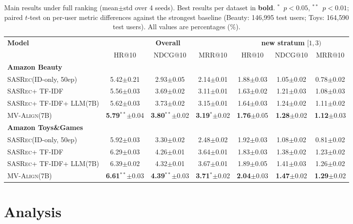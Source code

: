 \documentclass[sigconf,natbib=true,anonymous]{acmart}
\newcommand{\model}{\textsc{MV-Align}\xspace}
\newcommand{\base}{\textsc{SASRec}\xspace}
\newcommand{\tfidf}{\textsc{TF-IDF}\xspace}
\newcommand{\llm}{\textsc{LLM}\xspace}
\begin{document}
\begin{table}[t]
\caption{Main results under full ranking (mean$\pm$std over 4 seeds). Best results per dataset in \textbf{bold}. $^{*}$~$p{<}0.05$, $^{**}$~$p{<}0.01$; paired $t$-test on per-user metric differences against the strongest baseline (Beauty: 146{,}995 test users; Toys: 164{,}590 test users). All values are percentages (\%).}
\label{tab:main}
\centering
\small
\begin{tabular}{lcccccc}
\toprule
\multirow{2}{*}{\textbf{Model}} &
\multicolumn{3}{c}{\textbf{Overall}} &
\multicolumn{3}{c}{\textbf{new stratum} $[1,3)$} \\
\cmidrule(lr){2-4}\cmidrule(lr){5-7}
& HR@10 & NDCG@10 & MRR@10 & HR@10 & NDCG@10 & MRR@10 \\
\midrule
\multicolumn{7}{l}{\textbf{Amazon Beauty}} \\
\base (ID-only, 50ep) & 5.42$\pm$0.21 & 2.93$\pm$0.05 & 2.14$\pm$0.01 & 1.88$\pm$0.03 & 1.05$\pm$0.02 & 0.78$\pm$0.02 \\
\base + \tfidf & 5.56$\pm$0.03 & 3.69$\pm$0.02 & 3.11$\pm$0.01 & 1.63$\pm$0.02 & 1.21$\pm$0.03 & 1.08$\pm$0.03 \\
\base + \tfidf + \llm (7B) & 5.62$\pm$0.03 & 3.73$\pm$0.02 & 3.15$\pm$0.01 & 1.64$\pm$0.03 & 1.24$\pm$0.02 & 1.11$\pm$0.02 \\
\model (7B) & \textbf{5.79}$^{**}$$\pm$0.04 & \textbf{3.80}$^{**}$$\pm$0.02 & \textbf{3.19}$^{*}$$\pm$0.02 & \textbf{1.76}$\pm$0.05 & \textbf{1.28}$\pm$0.02 & \textbf{1.12}$\pm$0.03 \\
\midrule
\multicolumn{7}{l}{\textbf{Amazon Toys\&Games}} \\
\base (ID-only, 50ep) & 5.92$\pm$0.03 & 3.30$\pm$0.02 & 2.48$\pm$0.02 & 1.92$\pm$0.03 & 1.08$\pm$0.02 & 0.81$\pm$0.02 \\
\base + \tfidf & 6.29$\pm$0.03 & 4.26$\pm$0.01 & 3.64$\pm$0.01 & 1.83$\pm$0.03 & 1.38$\pm$0.02 & 1.23$\pm$0.02 \\
\base + \tfidf + \llm (7B) & 6.39$\pm$0.02 & 4.32$\pm$0.01 & 3.67$\pm$0.01 & 1.89$\pm$0.05 & 1.41$\pm$0.03 & 1.26$\pm$0.02 \\
\model (7B) & \textbf{6.61}$^{**}$$\pm$0.03 & \textbf{4.39}$^{**}$$\pm$0.03 & \textbf{3.71}$^{*}$$\pm$0.02 & \textbf{2.04}$\pm$0.03 & \textbf{1.47}$\pm$0.02 & \textbf{1.29}$\pm$0.02 \\
\bottomrule
\end{tabular}
\end{table}

\section{Analysis}\label{sec:analysis}
\end{document}
